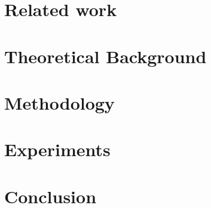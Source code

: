 \documentclass[conference]{IEEEtran}
\begin{document}
\section{Related work}
\label{Related work}


\section{Theoretical Background}
\label{Theoretical Background}


\section{Methodology}
\label{Methodology}


\section{Experiments}
\label{Experiments}



\section{Conclusion}
\label{Conclusion}




\end{document}
